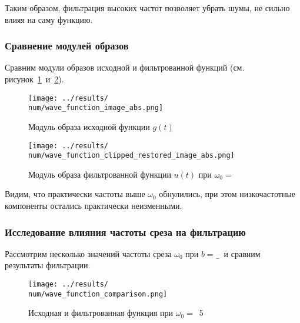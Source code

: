 Таким образом, фильтрация высоких частот позволяет убрать шумы, не сильно влияя на саму функцию.

\FloatBarrier
\subsubsection{Сравнение модулей образов}
Сравним модули образов исходной и фильтрованной функций (см. рисунок~\ref{fig:wave_function_image_abs_\num}~и~\ref{fig:wave_function_clipped_restored_image_abs_\num}).

\begin{figure}[ht!]
    \centering
    \texttt{[image: ../results/\\num/wave\_function\_image\_abs.png]}
    \caption{Модуль образа исходной функции $g(t)$}
    \label{fig:wave_function_image_abs_\num}
\end{figure}

\begin{figure}[ht!]
    \centering
    \texttt{[image: ../results/\\num/wave\_function\_clipped\_restored\_image\_abs.png]}
    \caption{Модуль образа фильтрованной функции $u(t)$ при $\omega_0=$~\imageclip}
    \label{fig:wave_function_clipped_restored_image_abs_\num}
\end{figure}

Видим, что практически частоты выше $\omega_0$ обнулились, при этом низкочастотные компоненты остались практически неизменными. 

\FloatBarrier
\subsubsection{Исследование влияния частоты среза на фильтрацию}

Рассмотрим несколько значений частоты среза $\omega_0$ при $b=$~\b~и сравним результаты фильтрации.

\def\num{2}
\def\imageclip{5}


\begin{figure}[ht!]
    \centering
    \texttt{[image: ../results/\\num/wave\_function\_comparison.png]}
    \caption{Исходная и фильтрованная функция при $\omega_0=$~\imageclip}
    \label{fig:wave_function_comparison_\num}
\end{figure}


